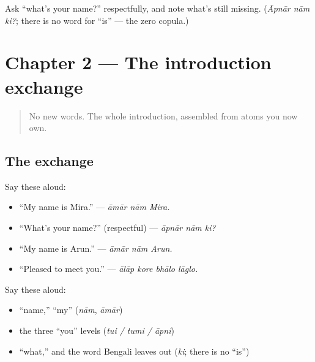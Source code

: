 \begin{tcolorbox}[breakable,colback=teal!4,colframe=teal!35!black,title={Before you move on}]
Ask \textquotedblleft{}what's your name?\textquotedblright{} respectfully, and note what's still missing. (\emph{Āpnār nām ki?}; there is no word for \textquotedblleft{}is\textquotedblright{} — the zero copula.)
\end{tcolorbox}
\section[Practice]{Chapter 2 — The introduction exchange}

\label{lesson:BN-C02-practice}



\begin{quote}
No new words. The whole introduction, assembled from atoms you now own.
\end{quote}

\subsection*{The exchange}
Say these aloud:

\begin{itemize}
\raggedright
  \item \textquotedblleft{}My name is Mira.\textquotedblright{} — \emph{āmār nām Mira.}
  \item \textquotedblleft{}What's your name?\textquotedblright{} (respectful) — \emph{āpnār nām ki?}
  \item \textquotedblleft{}My name is Arun.\textquotedblright{} — \emph{āmār nām Arun.}
  \item \textquotedblleft{}Pleased to meet you.\textquotedblright{} — \emph{ālāp kore bhālo lāglo.}
\end{itemize}

\begin{cousinweb}
Say these aloud:

\begin{itemize}
\raggedright
  \item \textquotedblleft{}name,\textquotedblright{} \textquotedblleft{}my\textquotedblright{} (\emph{nām}, \emph{āmār})
  \item the three \textquotedblleft{}you\textquotedblright{} levels (\emph{tui / tumi / āpni})
  \item \textquotedblleft{}what,\textquotedblright{} and the word Bengali leaves out (\emph{ki}; there is no \textquotedblleft{}is\textquotedblright{})
\end{itemize}
\end{cousinweb}


